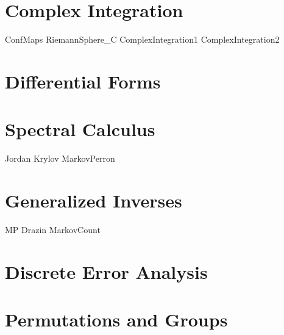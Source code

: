 \documentclass[nociteref]{newsiambook}
\begin{document}
\part{Complex Integration}
{ConfMaps}
{RiemannSphere_C}
{ComplexIntegration1}
{ComplexIntegration2}

\part{Differential Forms}

\part{Spectral Calculus}
{Jordan}
{Krylov}
{MarkovPerron}

\part{Generalized Inverses}
{MP}
{Drazin}
{MarkovCount}

\part{Discrete Error Analysis}

\part{Permutations and Groups}







\end{document}
